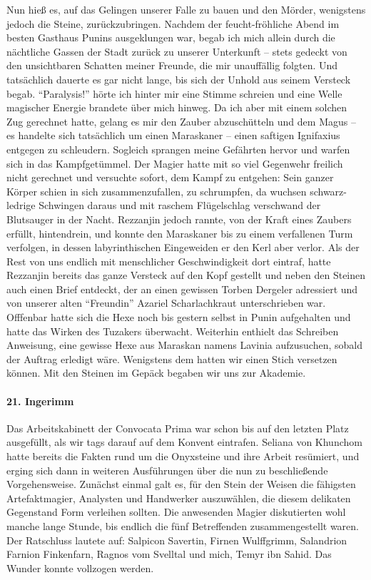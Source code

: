 Nun hieß es, auf das Gelingen unserer Falle zu bauen und den Mörder, wenigstens jedoch die Steine, zurückzubringen. Nachdem der feucht-fröhliche Abend im besten Gasthaus Punins ausgeklungen war, begab ich mich allein durch die nächtliche Gassen der Stadt zurück zu unserer Unterkunft -- stets gedeckt von den unsichtbaren Schatten meiner Freunde, die mir unauffällig folgten. Und tatsächlich dauerte es gar nicht lange, bis sich der Unhold aus seinem Versteck begab. ``Paralysis!'' hörte ich hinter mir eine Stimme schreien und eine Welle magischer Energie brandete über mich hinweg. Da ich aber mit einem solchen Zug gerechnet hatte, gelang es mir den Zauber abzuschütteln und dem Magus -- es handelte sich tatsächlich um einen Maraskaner -- einen saftigen Ignifaxius entgegen zu schleudern. Sogleich sprangen meine Gefährten hervor und warfen sich in das Kampfgetümmel. Der Magier hatte mit so viel Gegenwehr freilich nicht gerechnet und versuchte sofort, dem Kampf zu entgehen: Sein ganzer Körper schien in sich zusammenzufallen, zu schrumpfen, da wuchsen schwarz-ledrige Schwingen daraus und mit raschem Flügelschlag verschwand der Blutsauger in der Nacht. Rezzanjin jedoch rannte, von der Kraft eines Zaubers erfüllt, hintendrein, und konnte den Maraskaner bis zu einem verfallenen Turm verfolgen, in dessen labyrinthischen Eingeweiden er den Kerl aber verlor. Als der Rest von uns endlich mit menschlicher Geschwindigkeit dort eintraf, hatte Rezzanjin bereits das ganze Versteck auf den Kopf gestellt und neben den Steinen auch einen Brief entdeckt, der an einen gewissen Torben Dergeler adressiert und von unserer alten ``Freundin'' Azariel Scharlachkraut unterschrieben war. Offfenbar hatte sich die Hexe noch bis gestern selbst in Punin aufgehalten und hatte das Wirken des Tuzakers überwacht. Weiterhin enthielt das Schreiben Anweisung, eine gewisse Hexe aus Maraskan namens Lavinia aufzusuchen, sobald der Auftrag erledigt wäre. Wenigstens dem hatten wir einen Stich versetzen können. Mit den Steinen im Gepäck begaben wir uns zur Akademie.

\paragraph{21. Ingerimm}
Das Arbeitskabinett der Convocata Prima war schon bis auf den letzten Platz ausgefüllt, als wir tags darauf auf dem Konvent eintrafen. Seliana von Khunchom hatte bereits die Fakten rund um die Onyxsteine und ihre Arbeit resümiert, und erging sich dann in weiteren Ausführungen über die nun zu beschließende Vorgehensweise. Zunächst einmal galt es, für den Stein der Weisen die fähigsten Artefaktmagier, Analysten und Handwerker auszuwählen, die diesem delikaten Gegenstand Form verleihen sollten. Die anwesenden Magier diskutierten wohl manche lange Stunde, bis endlich die fünf Betreffenden zusammengestellt waren. Der Ratschluss lautete auf: Salpicon Savertin, Firnen Wulffgrimm, Salandrion Farnion Finkenfarn, Ragnos vom Svelltal und mich, Temyr ibn Sahid. Das Wunder konnte vollzogen werden.

